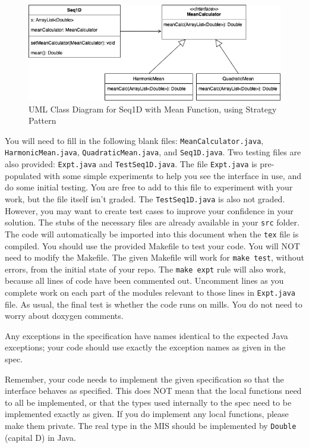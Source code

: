 \documentclass[12pt,fleqn]{examtst}
\begin{document}
\begin{figure}[!h]
\begin{center}
\includegraphics[scale=0.7]{Seq1D_Mean_Strategy_UML.png}
\end{center}
\caption{UML Class Diagram for Seq1D with Mean Function, using Strategy
  Pattern} \label{Fig_UML_Strategy}
\end{figure}

You will need to fill in the following blank files:
\texttt{MeanCalculator.java}, \texttt{HarmonicMean.java},
\texttt{QuadraticMean.java}, and \texttt{Seq1D.java}.  Two testing files are
also provided: \texttt{Expt.java} and \texttt{TestSeq1D.java}.  The file
\texttt{Expt.java} is pre-populated with some simple experiments to help you see
the interface in use, and do some initial testing.  You are free to add to this
file to experiment with your work, but the file itself isn't graded.  The
\texttt{TestSeq1D.java} is also not graded.  However, you may want to create
test cases to improve your confidence in your solution.  The stubs of the
necessary files are already available in your \texttt{src} folder.  The code
will automatically be imported into this document when the \texttt{tex} file is
compiled.  You should use the provided Makefile to test your code.  You will NOT
need to modify the Makefile.  The given Makefile will work for \texttt{make
  test}, without errors, from the initial state of your repo.  The \texttt{make
  expt} rule will also work, because all lines of code have been commented out.
Uncomment lines as you complete work on each part of the modules relevant to
those lines in \texttt{Expt.java} file.  As usual, the final test is whether the
code runs on mills.  You do not need to worry about doxygen comments.

Any exceptions in the specification have names identical to the expected Java
exceptions; your code should use exactly the exception names as given in the
spec.

Remember, your code needs to implement the given specification so that the
interface behaves as specified.  This does NOT mean that the local functions
need to all be implemented, or that the types used internally to the spec need
to be implemented exactly as given.  If you do implement any local functions,
please make them private.  The real type in the MIS should be implemented by
\texttt{Double} (capital D) in Java.
\end{document}
